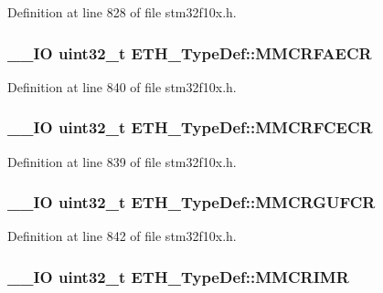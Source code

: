 Definition at line 828 of file stm32f10x.\-h.

\hypertarget{struct_e_t_h___type_def_ad057b9031295ab3b64e79145f7607469}{
\subsubsection[{M\-M\-C\-R\-F\-A\-E\-C\-R}]{\setlength{\rightskip}{0pt plus 5cm}\-\_\-\-\_\-\-I\-O {\bf uint32\-\_\-t} E\-T\-H\-\_\-\-Type\-Def\-::\-M\-M\-C\-R\-F\-A\-E\-C\-R}}\label{struct_e_t_h___type_def_ad057b9031295ab3b64e79145f7607469}


Definition at line 840 of file stm32f10x.\-h.

\hypertarget{struct_e_t_h___type_def_afe50f13adc614758cba541f942e8ef0e}{
\subsubsection[{M\-M\-C\-R\-F\-C\-E\-C\-R}]{\setlength{\rightskip}{0pt plus 5cm}\-\_\-\-\_\-\-I\-O {\bf uint32\-\_\-t} E\-T\-H\-\_\-\-Type\-Def\-::\-M\-M\-C\-R\-F\-C\-E\-C\-R}}\label{struct_e_t_h___type_def_afe50f13adc614758cba541f942e8ef0e}


Definition at line 839 of file stm32f10x.\-h.

\hypertarget{struct_e_t_h___type_def_a832a684c8f476941845d0fcba0fb75fc}{
\subsubsection[{M\-M\-C\-R\-G\-U\-F\-C\-R}]{\setlength{\rightskip}{0pt plus 5cm}\-\_\-\-\_\-\-I\-O {\bf uint32\-\_\-t} E\-T\-H\-\_\-\-Type\-Def\-::\-M\-M\-C\-R\-G\-U\-F\-C\-R}}\label{struct_e_t_h___type_def_a832a684c8f476941845d0fcba0fb75fc}


Definition at line 842 of file stm32f10x.\-h.

\hypertarget{struct_e_t_h___type_def_a80c2cf41b95fc14f304d60e4421b1bbd}{
\subsubsection[{M\-M\-C\-R\-I\-M\-R}]{\setlength{\rightskip}{0pt plus 5cm}\-\_\-\-\_\-\-I\-O {\bf uint32\-\_\-t} E\-T\-H\-\_\-\-Type\-Def\-::\-M\-M\-C\-R\-I\-M\-R}}\label{struct_e_t_h___type_def_a80c2cf41b95fc14f304d60e4421b1bbd}


